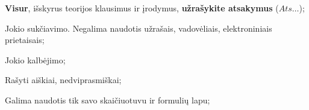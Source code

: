 \documentclass[a4paper]{article}
\begin{document}
\begin{small}
      \begin{enumerate*}[label={(\arabic*)}]
            \item \textbf{Visur}, išskyrus teorijos klausimus ir įrodymus,
            \textbf{užrašykite atsakymus} ($Ats\ldots$);
            \item Jokio sukčiavimo. Negalima naudotis užrašais, vadovėliais,
            elektroniniais prietaisais;
            \item Jokio kalbėjimo;
            \item Rašyti aiškiai, nedviprasmiškai;
            \item Galima naudotis tik savo skaičiuotuvu ir formulių lapu;
      \end{enumerate*}
\end{small}
\end{document}
